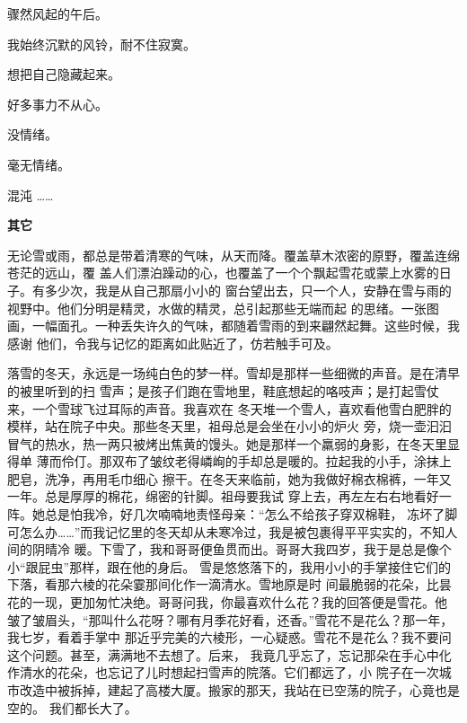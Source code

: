 \documentclass[12pt,a4paper]{article}
\def\blankrev{\vspace{1ex}}									%
\newcommand{\newsect}[1]{
	\begingroup
	\clearpage
	\par \vspace{2.8em}
	\LARGE\bfseries\centering #1
	\phantomsection \addcontentsline{toc}{section}{#1}
	\par %
	\endgroup
}
\begin{document}
		\blankrev
		骤然风起的午后。\par
		我始终沉默的风铃，耐不住寂寞。

	\endwriting



		想把自己隐藏起来。\par
		好多事力不从心。\par
		没情绪。\par
		毫无情绪。\par
		混沌 ……

	\endwriting

	\iffalse %
	\newsect{其它} %


		无论雪或雨，都总是带着清寒的气味，从天而降。覆盖草木浓密的原野，覆盖连绵苍茫的远山，覆
	盖人们漂泊躁动的心，也覆盖了一个个飘起雪花或蒙上水雾的日子。有多少次，我是从自己那扇小小的
	窗台望出去，只一个人，安静在雪与雨的视野中。他们分明是精灵，水做的精灵，总引起那些无端而起
	的思绪。一张图画，一幅面孔。一种丢失许久的气味，都随着雪雨的到来翩然起舞。这些时候，我感谢
	他们，令我与记忆的距离如此贴近了，仿若触手可及。

		落雪的冬天，永远是一场纯白色的梦一样。雪却是那样一些细微的声音。是在清早的被里听到的扫
	雪声；是孩子们跑在雪地里，鞋底想起的咯吱声；是打起雪仗来，一个雪球飞过耳际的声音。我喜欢在
	冬天堆一个雪人，喜欢看他雪白肥胖的模样，站在院子中央。那些冬天里，祖母总是会坐在小小的炉火
	旁，烧一壶汩汩冒气的热水，热一两只被烤出焦黄的馒头。她是那样一个羸弱的身影，在冬天里显得单
	薄而伶仃。那双布了皱纹老得嶙峋的手却总是暖的。拉起我的小手，涂抹上肥皂，洗净，再用毛巾细心
	擦干。在冬天来临前，她为我做好棉衣棉裤，一年又一年。总是厚厚的棉花，绵密的针脚。祖母要我试
	穿上去，再左左右右地看好一阵。她总是怕我冷，好几次喃喃地责怪母亲：“怎么不给孩子穿双棉鞋，
	冻坏了脚可怎么办……”而我记忆里的冬天却从未寒冷过，我是被包裹得平平实实的，不知人间的阴晴冷
	暖。下雪了，我和哥哥便鱼贯而出。哥哥大我四岁，我于是总是像个小“跟屁虫”那样，跟在他的身后。
	雪是悠悠落下的，我用小小的手掌接住它们的下落，看那六棱的花朵霎那间化作一滴清水。雪地原是时
	间最脆弱的花朵，比昙花的一现，更加匆忙决绝。哥哥问我，你最喜欢什么花？我的回答便是雪花。他
	皱了皱眉头，“那叫什么花呀？哪有月季花好看，还香。”雪花不是花么？那一年，我七岁，看着手掌中
	那近乎完美的六棱形，一心疑惑。雪花不是花么？我不要问这个问题。甚至，满满地不去想了。后来，
	我竟几乎忘了，忘记那朵在手心中化作清水的花朵，也忘记了儿时想起扫雪声的院落。它们都远了，小
	院子在一次城市改造中被拆掉，建起了高楼大厦。搬家的那天，我站在已空荡的院子，心竟也是空的。
	我们都长大了。
\end{document}
